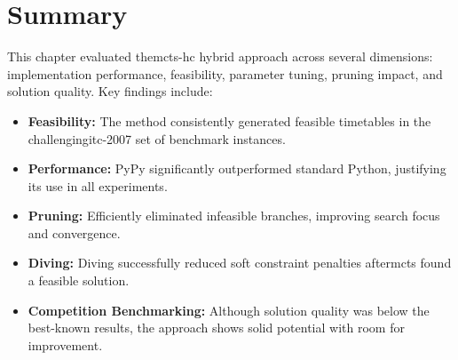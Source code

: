\section{Summary}

This chapter evaluated the\ac{mcts}-\ac{hc} hybrid approach across several dimensions: implementation performance, feasibility, parameter tuning, pruning impact, and solution quality. Key findings include:

\begin{itemize}
\item \textbf{Feasibility:} The method consistently generated feasible timetables in the challenging\ac{itc-2007} set of benchmark instances.

\item \textbf{Performance:} PyPy significantly outperformed standard Python, justifying its use in all experiments.

\item \textbf{Pruning:} Efficiently eliminated infeasible branches, improving search focus and convergence.

\item \textbf{Diving:} Diving successfully reduced soft constraint penalties after\ac{mcts} found a feasible solution.

\item \textbf{Competition Benchmarking:} Although solution quality was below the best-known results, the approach shows solid potential with room for improvement.
\end{itemize}